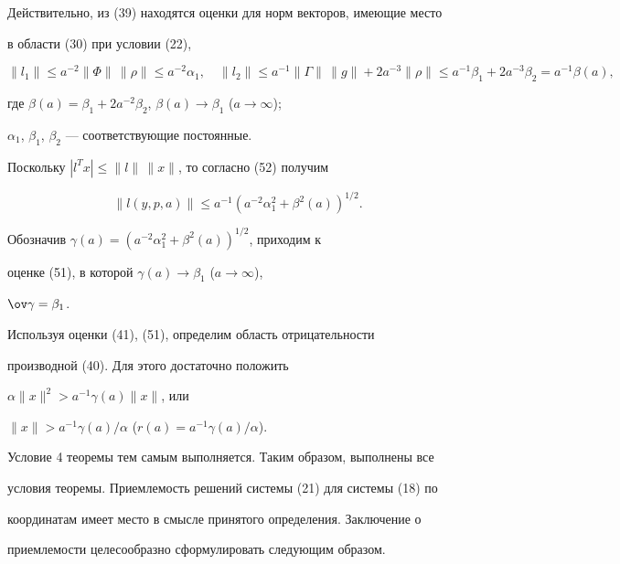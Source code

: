 Действительно, из (39) находятся оценки для норм векторов, имеющие место  


в области (30) при условии (22),


\begin{equation} 


\|l_1\|\le a^{-2}\|\Phi\|\,\|\rho\|\le a^{-2}\alpha_1,\quad 


\|l_2\|\le a^{-1}\|\Gamma\|\,\|g\|+2a^{-3}\|\rho\|\le 


a^{-1}\beta_1+2a^{-3}\beta_2=a^{-1}\beta(a), 


\end{equation} 


где $\beta(a)=\beta_1+2a^{-2}\beta_2$, $\beta(a)\to\beta_1$ ($a\to\infty$); 


$\alpha_1$, $\beta_1$, $\beta_2$ --- соответствующие постоянные. 


 


Поскольку $|l^T x|\le\|l\|\,\|x\|$, то согласно (52) получим 


$$ 


\|l(y,p,a)\|\le a^{-1}(a^{-2}\alpha^2_1+\beta^2(a))^{1/2}. 


$$  


Обозначив $\gamma(a)=(a^{-2}\alpha^2_1+\beta^2(a))^{1/2}$, приходим к 


оценке (51), в которой $\gamma(a)\to \beta_1$ ($a\to\infty$), 


$\ov\gamma=\beta_1$. 


  


Используя оценки (41), (51), определим область отрицательности  


производной (40). Для этого достаточно положить 


$\alpha\|x\|^2>a^{-1}\gamma(a)\|x\|$, или 


$\|x\|>a^{-1}\gamma(a)/\alpha$\; ($r(a)=a^{-1}\gamma(a)/\alpha$). 


  


Условие 4 теоремы тем самым выполняется. Таким образом, выполнены все  


условия теоремы. Приемлемость решений системы (21) для системы (18) по  


координатам имеет место в смысле принятого определения. Заключение о  


приемлемости целесообразно сформулировать следующим образом. 


